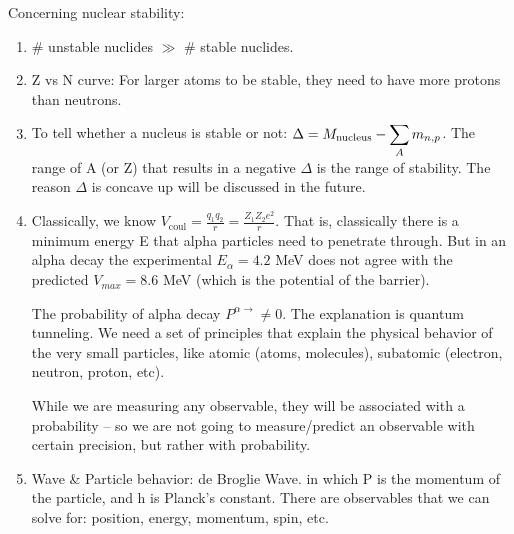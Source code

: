 \documentclass{school-22.101-notes}
\begin{document}
Concerning nuclear stability:
\begin{enumerate}
\item \# unstable nuclides $\gg$ \# stable nuclides.
\item Z vs N curve: For larger atoms to be stable, they need to have more protons than neutrons. 
\item To tell whether a nucleus is stable or not: $\Delta = M_{\mathrm{nucleus}} - \displaystyle\sum_A m_{n,p} $. The range of A (or Z) that results in a negative $\Delta$ is the range of stability. The reason $\Delta$ is concave up will be discussed in the future.
\item Classically, we know $V_{\mathrm{coul}} = \frac{q_1 q_2}{r} = \frac{Z_1 Z_2 e^2}{r}$. That is, classically there is a minimum energy E that alpha particles need to penetrate through. But in an alpha decay  the experimental $E_{\alpha} = 4.2$ MeV does not agree with the predicted $V_{max} = 8.6$ MeV (which is the potential of the barrier).

The probability of alpha decay $P^{\alpha \to} \neq 0$. The explanation is quantum tunneling. We need a set of principles that explain the physical behavior of the very small particles, like atomic (atoms, molecules), subatomic (electron, neutron, proton, etc). 

While we are measuring any observable, they will be associated with a probability -- so we are not going to measure/predict an observable with certain precision, but rather with probability. 

\item Wave \& Particle behavior: de Broglie Wave.
in which P is the momentum of the particle, and h is Planck's constant. There are observables that we can solve for: position, energy, momentum, spin, etc. 
\end{enumerate}


\end{document}
